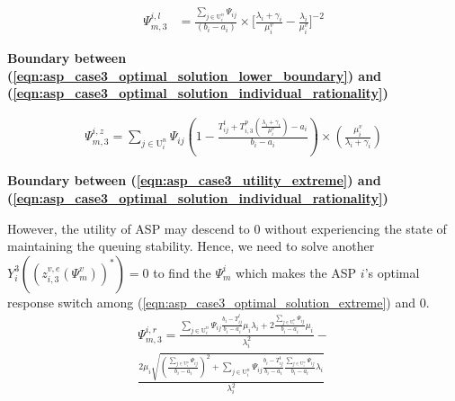 \documentclass[10pt,journal, compsoc]{IEEEtran}
\begin{document}
\begin{equation}
\begin{aligned}
\Psi_{m,3}^{i,l}&= \frac{\sum_{j \in \mathrm{U}_i^n}\Psi_{ij}}{(b_i-a_i)}\times \big[\frac{\lambda_i+\gamma_i}{\mu_i^v} - \frac{\lambda_i}{\mu_i^v}\big]^{-2}
\end{aligned}
\end{equation}

\textbf{Boundary between (\ref{eqn:asp_case3_optimal_solution_lower_boundary}) and (\ref{eqn:asp_case3_optimal_solution_individual_rationality})}

\begin{equation}
\begin{aligned}
\Psi_{m,3}^{i,z}= \sum_{j \in \mathrm{U}_i^n}\Psi_{ij}(1-\frac{T_{ij}^t + T_{i,3}^p(\frac{\lambda_i+\gamma_i}{\mu_i^v})-a_i}{b_i-a_i})\times(\frac{\mu_i^v}{\lambda_i+\gamma_i})
\end{aligned}
\end{equation}

\textbf{Boundary between (\ref{eqn:asp_case3_utility_extreme}) and (\ref{eqn:asp_case3_optimal_solution_individual_rationality})}

However, the utility of ASP may descend to $0$ without experiencing the state of maintaining the queuing stability. Hence, we need to solve another $Y_i^3((z_{i,3}^{v,e}(\Psi_m^v))^*) = 0$ to find the $\Psi_m^i$ which makes the ASP $i$'s optimal response switch among (\ref{eqn:asp_case3_optimal_solution_extreme}) and $0$. 
\begin{multline}
\Psi_{m,3}^{i,r} = \frac{\sum_{j \in \mathrm{U}_i^n}\Psi_{ij}\frac{b_i-T_{ij}^t }{b_i-a_i}\mu_i\lambda_i+2\frac{\sum_{j \in \mathrm{U}_i^n}\Psi_{ij}}{b_i-a_i}\mu_i}{\lambda_i^2}- \\
\frac{2\mu_i\sqrt{(\frac{\sum_{j \in \mathrm{U}_i^n}\Psi_{ij}}{b_i-a_i})^2+\sum_{j \in \mathrm{U}_i^n}\Psi_{ij}\frac{b_i-T_{ij}^t}{b_i-a_i}\frac{\sum_{j \in \mathrm{U}_i^n}\Psi_{ij}}{b_i-a_i}\lambda_i}}{\lambda_i^2}
\end{multline}
\end{document}
